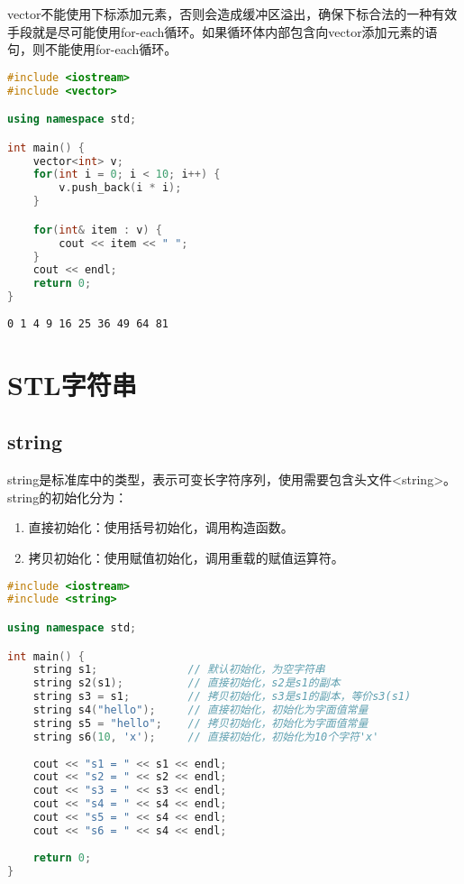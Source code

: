 vector不能使用下标添加元素，否则会造成缓冲区溢出，确保下标合法的一种有效手段就是尽可能使用for-each循环。如果循环体内部包含向vector添加元素的语句，则不能使用for-each循环。\\


\begin{lstlisting}[language=C++]
#include <iostream>
#include <vector>

using namespace std;

int main() {
    vector<int> v;
    for(int i = 0; i < 10; i++) {
        v.push_back(i * i);
    }

    for(int& item : v) {
        cout << item << " ";
    }
    cout << endl;
    return 0;
}
\end{lstlisting}

\begin{tcolorbox}
	\begin{verbatim}
0 1 4 9 16 25 36 49 64 81
	\end{verbatim}
\end{tcolorbox}

\newpage

\section{STL字符串}

\subsection{string}

string是标准库中的类型，表示可变长字符序列，使用需要包含头文件<string>。\\

string的初始化分为：

\begin{enumerate}
	\item 直接初始化：使用括号初始化，调用构造函数。
	\item 拷贝初始化：使用赋值初始化，调用重载的赋值运算符。
\end{enumerate}

\vspace{0.5cm}


\begin{lstlisting}[language=C++]
#include <iostream>
#include <string>

using namespace std;

int main() {
    string s1;              // 默认初始化，为空字符串
    string s2(s1);          // 直接初始化，s2是s1的副本
    string s3 = s1;         // 拷贝初始化，s3是s1的副本，等价s3(s1)
    string s4("hello");     // 直接初始化，初始化为字面值常量
    string s5 = "hello";    // 拷贝初始化，初始化为字面值常量
    string s6(10, 'x');     // 直接初始化，初始化为10个字符'x'
    
    cout << "s1 = " << s1 << endl;
    cout << "s2 = " << s2 << endl;
    cout << "s3 = " << s3 << endl;
    cout << "s4 = " << s4 << endl;
    cout << "s5 = " << s4 << endl;
    cout << "s6 = " << s4 << endl;
    
    return 0;
}
\end{lstlisting}

